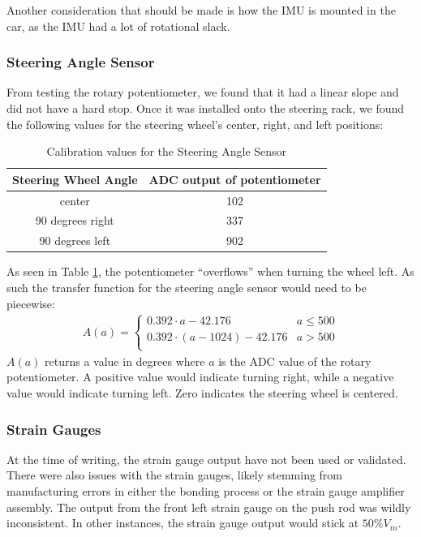 Another consideration that should be made is how the IMU is mounted in the car, as the IMU had a lot of rotational slack.
\subsubsection{Steering Angle Sensor}
From testing the rotary potentiometer, we found that it had a linear slope and did not have a hard stop.
Once it was installed onto the steering rack, we found the following values for the steering wheel's center, right, and left positions:
\begin{table}[H]
    \centering
    \begin{tabular}{|c|c|}
        \hline
         Steering Wheel Angle & ADC output of potentiometer \\
        \hline
         center & 102 \\
         90 degrees right & 337 \\
         90 degrees left & 902 \\
        \hline
    \end{tabular}
    \caption{Calibration values for the Steering Angle Sensor}
    \label{tab:sas}
\end{table}
As seen in Table \ref{tab:sas}, the potentiometer ``overflows'' when turning the wheel left.
As such the transfer function for the steering angle sensor would need to be piecewise:
\begin{gather}
    A(a) = \begin{cases} 
      0.392\cdot a - 42.176 & a \leq 500 \\
      0.392\cdot (a - 1024) - 42.176 & a > 500 \\
   \end{cases}
\end{gather}
$A(a)$ returns a value in degrees where $a$ is the ADC value of the rotary potentiometer.
A positive value would indicate turning right, while a negative value would indicate turning left.
Zero indicates the steering wheel is centered.

\subsubsection{Strain Gauges}
At the time of writing, the strain gauge output have not been used or validated.
There were also issues with the strain gauges, likely stemming from manufacturing errors in either the bonding process or the strain gauge amplifier assembly.
The output from the front left strain gauge on the push rod was wildly inconsistent.
In other instances, the strain gauge output would stick at $50\%V_{in}$. 

